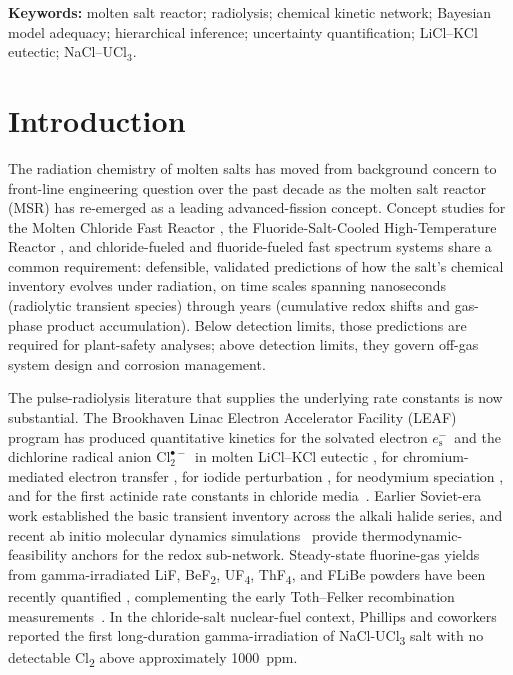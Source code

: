 \documentclass[12pt]{article}
\theoremstyle{plain}
\theoremstyle{definition}
\theoremstyle{remark}
\newcommand{\eS}{\ensuremath{e_{\mathrm{s}}^{-}}\xspace}
\newcommand{\Clt}{\ensuremath{\mathrm{Cl}_2^{\bullet-}}\xspace}
\begin{document}
\noindent\textbf{Keywords:}
molten salt reactor;
radiolysis;
chemical kinetic network;
Bayesian model adequacy;
hierarchical inference;
uncertainty quantification;
LiCl--KCl eutectic;
NaCl--UCl$_3$.

\bigskip

\section{Introduction}\label{sec:intro}

The radiation chemistry of molten salts has moved from background concern to
front-line engineering question over the past decade as the molten salt reactor
(MSR) has re-emerged as a leading advanced-fission concept.  Concept studies for
the Molten Chloride Fast Reactor \citep{TerraPower2021}, the Fluoride-Salt-Cooled
High-Temperature Reactor \citep{Forsberg2020}, and chloride-fueled and
fluoride-fueled fast spectrum systems share a common requirement:  defensible,
validated predictions of how the salt's chemical inventory evolves under
radiation, on time scales spanning nanoseconds (radiolytic transient species)
through years (cumulative redox shifts and gas-phase product accumulation).
Below detection limits, those predictions are required for plant-safety
analyses; above detection limits, they govern off-gas system design and
corrosion management.

The pulse-radiolysis literature that supplies the underlying rate constants is
now substantial.  The Brookhaven Linac Electron Accelerator Facility (LEAF)
program has produced quantitative kinetics for the solvated electron
\eS\ and the dichlorine radical anion \Clt\ in molten LiCl--KCl eutectic
\citep{Iwamatsu2022}, for chromium-mediated electron transfer
\citep{Iwamatsu2026}, for iodide perturbation \citep{Conrad2023}, for
neodymium speciation \citep{CastroBaldivieso2026}, and for the first
actinide rate constants in chloride media~\citep{Rotermund2024}.
Earlier Soviet-era work \citep{Pikaev1982,Makarov1982,Hagiwara1987}
established the basic transient inventory across the alkali halide series,
and recent ab initio molecular dynamics simulations~\citep{KristoffersenMetiu2018}
provide thermodynamic-feasibility anchors for the redox sub-network.
Steady-state fluorine-gas yields from gamma-irradiated LiF, BeF\textsubscript{2},
UF\textsubscript{4}, ThF\textsubscript{4}, and FLiBe powders have been recently
quantified \citep{Davis2022}, complementing the early Toth--Felker recombination
measurements~\citep{Toth1990}.  In the chloride-salt nuclear-fuel context,
Phillips and coworkers \citep{Phillips2022} reported the first long-duration
gamma-irradiation of \mbox{NaCl-UCl\textsubscript{3}} salt with no detectable
Cl\textsubscript{2} above approximately \SI{1000}{ppm}.
\end{document}
